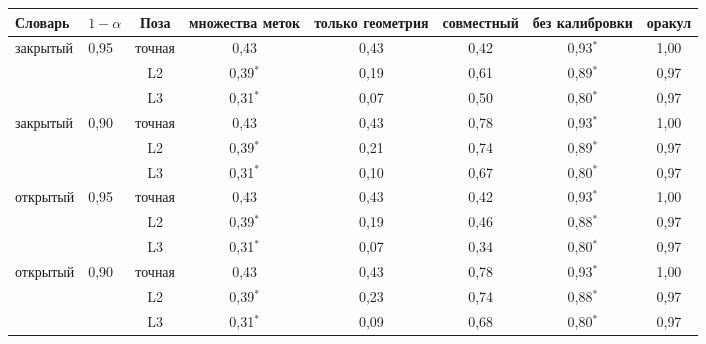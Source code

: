 \begin{tabular}{llc|ccccc}
\toprule
Словарь & $1 - \alpha$ & Поза & множества меток & только геометрия & \textbf{совместный} & без калибровки & оракул \\
\midrule
закрытый & 0{,}95 & точная & 0{,}43 & 0{,}43 & 0{,}42 & 0{,}93$^\ast$ & 1{,}00 \\
 &  & L2 & 0{,}39$^\ast$ & 0{,}19 & 0{,}61 & 0{,}89$^\ast$ & 0{,}97 \\
 &  & L3 & 0{,}31$^\ast$ & 0{,}07 & 0{,}50 & 0{,}80$^\ast$ & 0{,}97 \\
\midrule
закрытый & 0{,}90 & точная & 0{,}43 & 0{,}43 & 0{,}78 & 0{,}93$^\ast$ & 1{,}00 \\
 &  & L2 & 0{,}39$^\ast$ & 0{,}21 & 0{,}74 & 0{,}89$^\ast$ & 0{,}97 \\
 &  & L3 & 0{,}31$^\ast$ & 0{,}10 & 0{,}67 & 0{,}80$^\ast$ & 0{,}97 \\
\midrule
открытый & 0{,}95 & точная & 0{,}43 & 0{,}43 & 0{,}42 & 0{,}93$^\ast$ & 1{,}00 \\
 &  & L2 & 0{,}39$^\ast$ & 0{,}19 & 0{,}46 & 0{,}88$^\ast$ & 0{,}97 \\
 &  & L3 & 0{,}31$^\ast$ & 0{,}07 & 0{,}34 & 0{,}80$^\ast$ & 0{,}97 \\
\midrule
открытый & 0{,}90 & точная & 0{,}43 & 0{,}43 & 0{,}78 & 0{,}93$^\ast$ & 1{,}00 \\
 &  & L2 & 0{,}39$^\ast$ & 0{,}23 & 0{,}74 & 0{,}88$^\ast$ & 0{,}97 \\
 &  & L3 & 0{,}31$^\ast$ & 0{,}09 & 0{,}68 & 0{,}80$^\ast$ & 0{,}97 \\
\bottomrule
\end{tabular}

